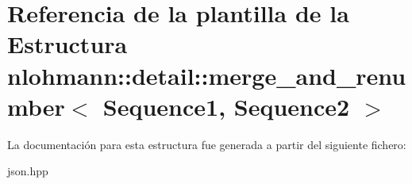 \hypertarget{structnlohmann_1_1detail_1_1merge__and__renumber}{}\section{Referencia de la plantilla de la Estructura nlohmann\+:\+:detail\+:\+:merge\+\_\+and\+\_\+renumber$<$ Sequence1, Sequence2 $>$}
\label{structnlohmann_1_1detail_1_1merge__and__renumber}


La documentación para esta estructura fue generada a partir del siguiente fichero\+:\begin{DoxyCompactItemize}
\item 
json.\+hpp\end{DoxyCompactItemize}

